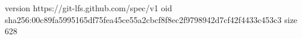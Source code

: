 version https://git-lfs.github.com/spec/v1
oid sha256:00c89fa5995165df75fea45ce55a2cbcf8f8ec2f9798942d7cf42f4433c453c3
size 628
